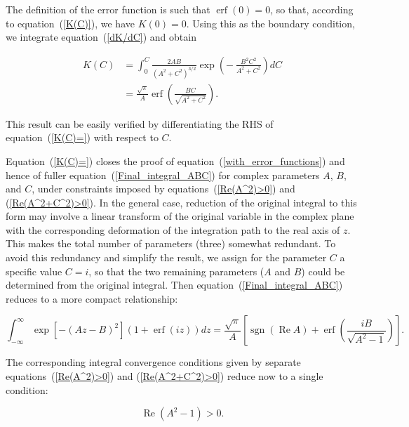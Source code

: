 \documentclass[draft]{agujournal2019}
\begin{document}
{\begin{linenomath*}
\end{linenomath*}
The definition of the error function is such that $\operatorname{erf}(0)=0$, so that,
according to equation~(\ref{K(C)}), we have $K(0)=0$. Using this as the
boundary condition, we integrate equation~(\ref{dK/dC}) and obtain
\begin{linenomath*}
\begin{align}
K(C)  &  =\int_{0}^{C}\frac{2AB}{\left(  A^{2}+C^{2}\right)  ^{3/2}}%
\exp\left(  -\ \frac{B^{2}C^{2}}{A^{2}+C^{2}}\right)  dC\nonumber\\
&  =\frac{\sqrt{\pi}}{A}\operatorname{erf}\left(  \frac{BC}{\sqrt{A^{2}+C^{2}%
}}\right)  . 
\label{K(C)=}
\end{align}
\end{linenomath*}
This result can be easily verified by differentiating the RHS of
equation~(\ref{K(C)=}) with respect to $C$. 

Equation~(\ref{K(C)=}) closes the
proof of equation~(\ref{with_error_functions}) and hence of fuller
equation~(\ref{Final_integral_ABC}) for complex parameters $A$, $B$, and $C$,
under constraints imposed by equations~(\ref{Re(A^2)>0}) and
(\ref{Re(A^2+C^2)>0}). In the general case, reduction of the original integral
to this form may involve a linear transform of the original variable in the
complex plane with the corresponding deformation of the integration path to
the real axis of $z$. This makes the total number of parameters (three)
somewhat redundant. To avoid this redundancy and simplify the result, we assign for the parameter
$C$ a specific value $C=i$, so that the two remaining parameters ($A$ and $B$)
could be determined from the original integral. Then
equation~(\ref{Final_integral_ABC}) reduces to a more compact relationship:
\begin{linenomath*}
\begin{equation}
\int_{-\infty}^{\infty}\exp\left[  -\left(  Az-B\right)  ^{2}\right]  \left(
1+\operatorname{erf}\left(  iz\right)  \right)  dz=\frac{\sqrt{\pi}}{A}\left[
\operatorname{sgn}(\operatorname{Re}A) + \operatorname{erf}\left(  \frac{iB}{\sqrt{A^{2}-1}}\right)  \right]  .
\label{Final_integral_AB}
\end{equation}
\end{linenomath*}
The corresponding integral convergence conditions given by separate
equations~(\ref{Re(A^2)>0}) and (\ref{Re(A^2+C^2)>0}) reduce now to a single
condition:
\begin{linenomath*}
\begin{equation}
\operatorname{Re}(A^{2}-1)>0. 
\label{Re(A^2-1)>0}
\end{equation}
\end{linenomath*}


}
\end{document}
